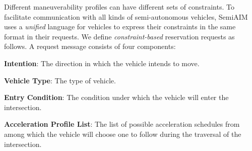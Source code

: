 Different maneuverability profiles can have different sets of
constraints.  To facilitate communication with all kinds of
semi-autonomous vehicles, SemiAIM uses a \emph{unified}
language for vehicles to express their constraints in the same format
in their requests.  We define \emph{constraint-based} reservation
requests as follows.  A request message consists of four components:
\begin{compactenum}
\item{\bf Intention}: The direction in which the vehicle intends to
  move.
\item{\bf Vehicle Type}: The type of vehicle.
\item{\bf Entry Condition}: The condition under which the vehicle
  will enter the intersection.
\item{\bf Acceleration Profile List}: The list of possible acceleration schedules
  from among which the vehicle will choose one to follow
  during the traversal of the intersection.
\end{compactenum}
% 
